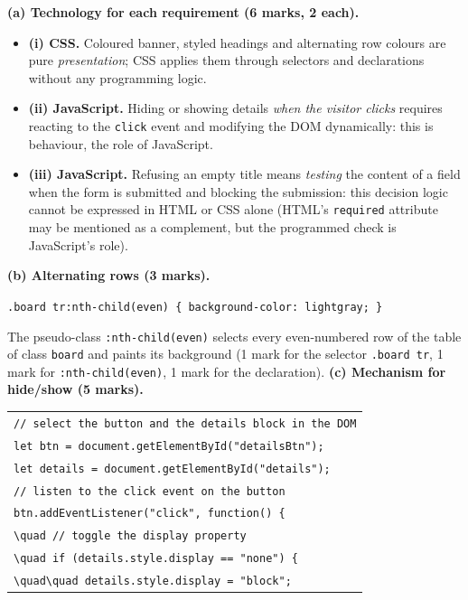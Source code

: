 \documentclass[11pt]{article}
\begin{document}
\begin{corrige}
\textbf{(a) Technology for each requirement (6 marks, 2 each).}
\begin{itemize}
\item \textbf{(i) CSS.} Coloured banner, styled headings and alternating row colours are pure \emph{presentation}; CSS applies them through selectors and declarations without any programming logic.
\item \textbf{(ii) JavaScript.} Hiding or showing details \emph{when the visitor clicks} requires reacting to the \texttt{click} event and modifying the DOM dynamically: this is behaviour, the role of JavaScript.
\item \textbf{(iii) JavaScript.} Refusing an empty title means \emph{testing} the content of a field when the form is submitted and blocking the submission: this decision logic cannot be expressed in HTML or CSS alone (HTML's \texttt{required} attribute may be mentioned as a complement, but the programmed check is JavaScript's role).
\end{itemize}
\textbf{(b) Alternating rows (3 marks).}
\begin{center}
\texttt{.board tr:nth-child(even) \{ background-color: lightgray; \}}
\end{center}
The pseudo-class \texttt{:nth-child(even)} selects every even-numbered row of the table of class \texttt{board} and paints its background (1 mark for the selector \texttt{.board tr}, 1 mark for \texttt{:nth-child(even)}, 1 mark for the declaration).
\textbf{(c) Mechanism for hide/show (5 marks).}
\begin{center}
\begin{tabular}{l}
\texttt{// select the button and the details block in the DOM}\\
\texttt{let btn = document.getElementById("detailsBtn");}\\
\texttt{let details = document.getElementById("details");}\\
\texttt{// listen to the click event on the button}\\
\texttt{btn.addEventListener("click", function() \{}\\
\texttt{\textbackslash{}quad // toggle the display property}\\
\texttt{\textbackslash{}quad if (details.style.display == "none") \{}\\
\texttt{\textbackslash{}quad\textbackslash{}quad details.style.display = "block";}\\

\end{tabular}
\end{center}
\end{corrige}
\end{document}
